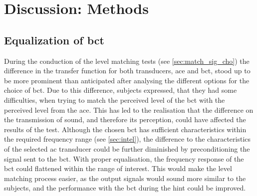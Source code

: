 \section{Discussion: Methods}\label{sec:disc_meth}

\subsection*{Equalization of \gls{bct}}
During the conduction of the level matching tests (see \autoref{sec:match_sig_cho}) the difference in the transfer function for both transducers, \gls{ace} and \gls{bct}, stood up to be more prominent than anticipated after analysing the different options for the choice of \gls{bct}. 
Due to this difference, subjects expressed, that they had some difficulties,  when trying to match the perceived level of the \gls{bct} with the perceived level from the \gls{ace}. 
This has led to the realisation that the difference on the transmission of sound, and therefore its perception, could have affected the results of the test.
Although the chosen \gls{bct} has sufficient characteristics within the required frequency range (see \autoref{sec:intel}), the difference to the characteristics of the selected \gls{ac} transducer could be further diminished by preconditioning the signal sent to the \gls{bct}.
With proper equalisation, the frequency response of the \gls{bct} could flattened within the range of interest. 
This would make the level matching process easier, as the output signals would sound more similar to the subjects, and the performance with the \gls{bct} during the \gls{hint} could be improved.

